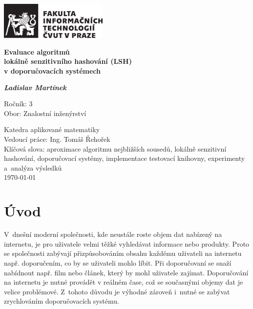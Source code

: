 \documentclass[11pt]{article}
\begin{document}
	\begin{titlepage}
	 \includegraphics[width=0.4\textwidth]{logo_FIT_cb}
		\begin{center}
        \vspace*{4.5cm}
        \huge
        \textbf{Evaluace algoritmů \\lokálně senzitivního hashování (LSH) \\v doporučovacích systémech}
        
        \vspace{3cm}
        \LARGE
        \textbf{ \textit{Ladislav Martínek}}

        \vfill
        \large
        
        Ročník: 3\\
        Obor: Znalostní inženýrství\\
        \vspace{0.5cm}
        
        Katedra aplikované matematiky\\
        Vedoucí práce: Ing. Tomáš Řehořek \\
        \vspace{2.5cm}
        Klíčová slova: aproximace algoritmu nejbližších sousedů, lokálně senzitivní hashování, doporučovací systémy, implementace testovací knihovny, experimenty a~analýza výsledků\\
        \vspace{0.5cm}
        \today
    \end{center}
 	\end{titlepage}
 
 

 
\section{Úvod} 
V~dnešní moderní společnosti, kde neustále roste objem dat nabízený na internetu,
je pro uživatele velmi těžké vyhledávat informace nebo produkty. Proto
se společnosti zabývají přizpůsobováním obsahu každému uživateli na internetu
např. doporučením, co by se uživateli mohlo líbit. Při doporučovaní se
snaží nabídnout např. film nebo článek, který by mohl uživatele zajímat. Doporučování
na internetu je nutné provádět v reálném čase, což se současnými
objemy dat je velice problémové. Z~tohoto důvodu je výhodné
zároveň i~nutné se zabývat zrychlováním doporučovacích systému.
\end{document}
